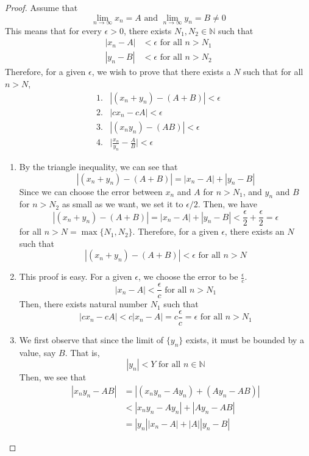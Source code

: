 \documentclass{article}
\theoremstyle{remark}
\theoremstyle{definition}
\begin{document}
\begin{proof}
Assume that 
\[\lim_{n \rightarrow \infty} x_n = A \text{ and } \lim_{n \rightarrow \infty} y_n = B \neq 0\]
This means that for every $\epsilon > 0$, there exists $N_1, N_2 \in \mathbb{N}$ such that
\begin{align*}
    |x_n - A| &< \epsilon \text{ for all } n > N_1 \\
    |y_n - B| &< \epsilon \text{ for all } n > N_2
\end{align*}
Therefore, for a given $\epsilon$, we wish to prove that there exists a $N$ such that for all $n > N$, 
\begin{align*}
    1. & |(x_n + y_n) - (A+B)| < \epsilon \\
    2. & |c x_n - cA| < \epsilon \\
    3. & |(x_n y_n) - (AB)| < \epsilon \\
    4. & \bigg| \frac{x_n}{y_n} - \frac{A}{B} \bigg| < \epsilon
\end{align*}
\begin{enumerate}
    \item By the triangle inequality, we can see that
    \[|(x_n + y_n) - (A+B)| = |x_n - A| + |y_n - B| \]
    Since we can choose the error between $x_n$ and $A$ for $n > N_1$, and $y_n$ and $B$ for $n>N_2$ as small as we want, we set it to $\epsilon/2$. Then, we have
    \[|(x_n + y_n) - (A+B)| = |x_n - A| + |y_n - B| < \frac{\epsilon}{2} + \frac{\epsilon}{2} = \epsilon\]
    for all $n> N = \max\{N_1, N_2\}$. Therefore, for a given $\epsilon$, there exists an $N$ such that 
    \[|(x_n + y_n) - (A+B)| < \epsilon \text{ for all } n > N\]
    \item This proof is easy. For a given $\epsilon$, we choose the error to be $\frac{\epsilon}{c}$.
    \[|x_n - A| < \frac{\epsilon}{c} \text{ for all } n >N_1\]
    Then, there exists natural number $N_1$ such that
    \[|c x_n - c A| < c |x_n - A| =  c \frac{\epsilon}{c} = \epsilon \text{ for all } n > N_1\]
    \item We first observe that since the limit of $\{y_n\}$ exists, it must be bounded by a value, say $B$. That is, 
    \[|y_n| < Y \text{ for all } n \in \mathbb{N}\]
    Then, we see that
    \begin{align*}
        |x_n y_n - AB| & = |(x_n y_n - Ay_n) + (Ay_n - AB)| \\
        & < |x_n y_n - A y_n| + |A y_n - AB| \\
        & = |y_n| |x_n - A| + |A| |y_n - B|
    \end{align*}

\end{enumerate}
\end{proof}
\end{document}
